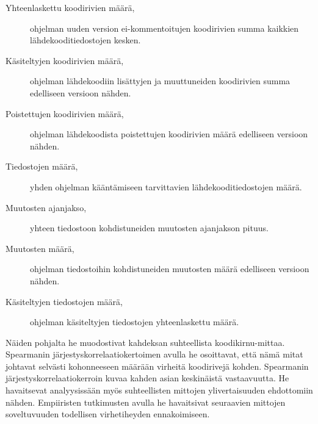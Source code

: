 \documentclass[finnish]{../tktltiki2}
\theoremstyle{definition}
\theoremstyle{remark}
\begin{document}
\begin{description}
    
    \item[Yhteenlaskettu koodirivien määrä,] ohjelman uuden version ei-kommen\-toitujen koodirivien summa kaikkien 
    lähdekooditiedostojen kesken.
    
    \item[Käsiteltyjen koodirivien määrä,] ohjelman lähdekoodiin lisättyjen ja muuttuneiden koodirivien summa 
    edelliseen versioon nähden.
    
    \item[Poistettujen koodirivien määrä,] ohjelman lähdekoodista poistettujen koodirivien määrä edelliseen versioon 
    nähden.
    
    \item[Tiedostojen määrä,] yhden ohjelman kääntämiseen tarvittavien lähdekoodi\-tiedostojen määrä.
    
    \item[Muutosten ajanjakso,] yhteen tiedostoon kohdistuneiden muutosten ajanjakson pituus.
    
    \item[Muutosten määrä,] ohjelman tiedostoihin kohdistuneiden muutosten määrä edelliseen versioon nähden.
    
    \item[Käsiteltyjen tiedostojen määrä,] ohjelman käsiteltyjen tiedostojen yhteenlaskettu määrä.

\end{description}

    Näiden pohjalta he muodostivat kahdeksan suhteellista koodikirnu-mittaa. Spearmanin järjestyskorrelaatiokertoimen 
avulla he osoittavat, että nämä mitat johtavat selvästi kohonneeseen määrään virheitä koodirivejä kohden. Spearmanin 
järjestyskorrelaatiokerroin kuvaa kahden asian keskinäistä vastaavuutta. He havaitsevat analyysissään myös suhteellisten 
mittojen ylivertaisuuden ehdottomiin nähden. Empiiristen tutkimusten avulla he havaitsivat seuraavien mittojen 
soveltuvuuden todellisen virhetiheyden ennakoimiseen.
\end{document}
